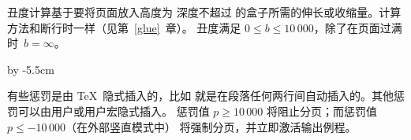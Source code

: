 \documentclass{book}
\begin{document}
丑度计算基于要将页面放入高度为  深度不超过 
的盒子所需的伸长或收缩量。计算方法和断行时一样（见第~\ref{glue}~章）。
丑度满足 $0\leq b\leq 10\,000$，除了在页面过满时~$b=\infty$。

\advance\rightskip by -5.5cm

有些惩罚是由 \TeX\ 隐式插入的，比如 
就是在段落任何两行间自动插入的。其他惩罚可以由用户或用户宏隐式插入。
惩罚值 $p\geq10\,000$ 将阻止分页；而惩罚值
$p\leq-10\,000$（在外部竖直模式中）%
\alt
将强制分页，并立即激活输出例程。
\end{document}
